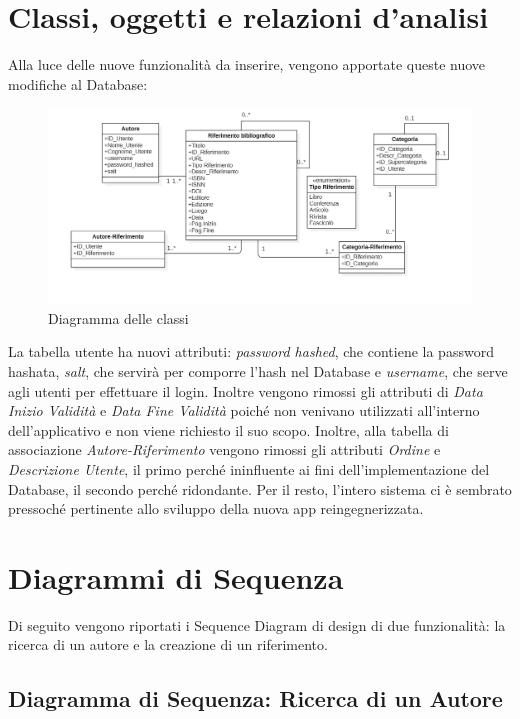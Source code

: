 \raggedright{\section{Classi, oggetti e relazioni d'analisi}}
Alla luce delle nuove funzionalità da inserire, vengono apportate queste nuove modifiche al Database: 
\begin{figure}[H]
    \centering
            \includegraphics[width=.90\textwidth]{Immagini/Alexandria/UML DB.PNG} 
    \caption{Diagramma delle classi}
\end{figure}

        
La tabella utente ha nuovi attributi: \textit{password hashed}, che contiene la password hashata, \textit{salt}, che servirà per comporre l'hash nel Database e \textit{username}, che serve agli utenti per effettuare il login. Inoltre vengono rimossi gli attributi di \textit{Data Inizio Validità} e \textit{Data Fine Validità} poiché non venivano utilizzati all'interno dell'applicativo e non viene richiesto il suo scopo. Inoltre, alla tabella di associazione \textit{Autore-Riferimento} vengono rimossi gli attributi \textit{Ordine} e \textit{Descrizione Utente}, il primo perché ininfluente ai fini dell'implementazione del Database, il secondo perché ridondante. Per il resto, l'intero sistema ci è sembrato pressoché pertinente allo sviluppo della nuova app reingegnerizzata.
\newpage
\raggedright{\section{Diagrammi di Sequenza}}
Di seguito vengono riportati i Sequence Diagram di design di due funzionalità: la ricerca di un autore e la creazione di un riferimento. 

\raggedright{\subsection{Diagramma di Sequenza: Ricerca di un Autore}}

